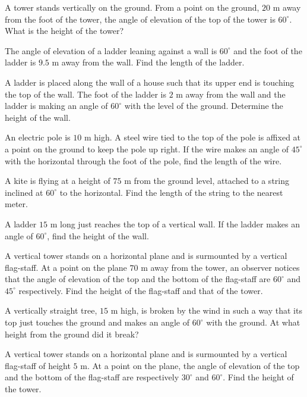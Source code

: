 \item A tower stands vertically on the ground. From a point on the ground, $20$ m away from the foot of the tower, the angle of
  elevation of the top of the tower is $60^\circ$. What is the height of the tower?

\item The angle of elevation of a ladder leaning against a wall is $60^\circ$ and the foot of the ladder is $9.5$ m away
  from the wall. Find the length of the ladder.

\item A ladder is placed along the wall of a house such that its upper end is touching the top of the wall. The foot of the ladder is
  $2$ m away from the wall and the ladder is making an angle of $60^\circ$ with the level of the ground. Determine
  the height of the wall.

\item An electric pole is $10$ m high. A steel wire tied to the top of the pole is affixed at a point on the ground to keep the
  pole up right. If the wire makes an angle of $45^\circ$ with the horizontal through the foot of the pole, find the length
  of the wire.

\item A kite is flying at a height of $75$ m from the ground level, attached to a string inclined at $60^\circ$ to the
  horizontal. Find the length of the string to the nearest meter.

\item A ladder $15$ m long just reaches the top of a vertical wall. If the ladder makes an angle of $60^\circ$, find the
  height of the wall.

\item A vertical tower stands on a horizontal plane and is surmounted by a vertical flag-staff. At a point on the plane $70$ m
  away from the tower, an observer notices that the angle of elevation of the top and the bottom of the flag-staff are
  $60^\circ$ and $45^\circ$ respectively. Find the height of the flag-staff and that of the tower.

\item A vertically straight tree, $15$ m high, is broken by the wind in such a way that its top just touches the ground and
  makes an angle of $60^\circ$ with the ground. At what height from the ground did it break?

\item A vertical tower stands on a horizontal plane and is surmounted by a vertical flag-staff of height $5$ m. At a point on
  the plane, the angle of elevation of the top and the bottom of the flag-staff are respectively $30^\circ$ and
  $60^\circ$. Find the height of the tower.

